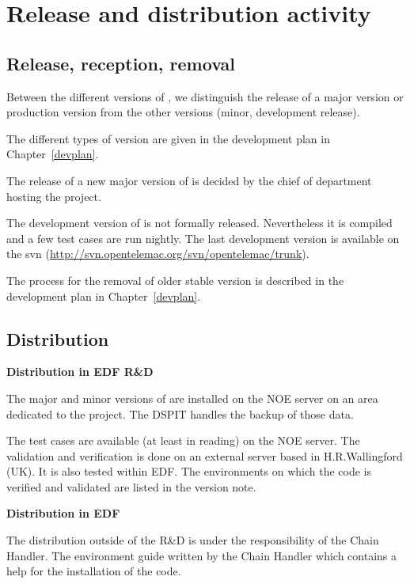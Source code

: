 \section{Release and distribution activity}

\subsection{Release, reception, removal}

Between the different versions of \telemacsystem, we distinguish the release of
a major version or production version from the other versions (minor,
development release).

The different types of version are given in the development plan in
Chapter~\ref{devplan}.

The release of a new major version of \telemacsystem{} is decided by the chief
of department hosting the \telemacsystem{} project.

The development version of \telemacsystem{} is not formally released.
Nevertheless it is compiled and a few test cases are run nightly. The last
development version is available on the \telemacsystem{} svn
(\url{http://svn.opentelemac.org/svn/opentelemac/trunk}).

The process for the removal of older stable version is described in the
development plan in Chapter~\ref{devplan}.

\subsection{Distribution}

\textbf{Distribution in EDF R\&D}

The major and minor versions of \telemacsystem{} are installed on the NOE
server on an area dedicated to the project. The DSPIT handles the backup of
those data.

The test cases are available (at least in reading) on the NOE server. The
validation and verification is done on an external server based in
H.R.Wallingford (UK). It is also tested within EDF\@. The environments on which
the code is verified and validated are listed in the version note.

\textbf{Distribution in EDF}

The distribution outside of the R\&D is under the responsibility of the
\telemacsystem{} Chain Handler. The environment guide written by the Chain
Handler which contains a help for the installation of the code.

